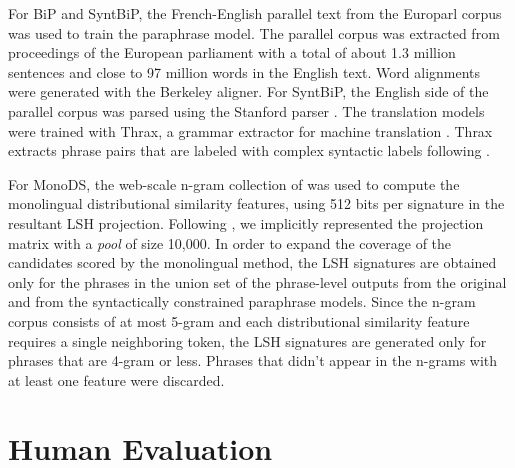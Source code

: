 \documentclass[11pt]{article}
\begin{document}
For BiP and SyntBiP, the French-English parallel text from the Europarl corpus \cite{Koehn05} was used to train the paraphrase model. The parallel corpus was extracted from proceedings of the European parliament with a total of about 1.3 million sentences and close to 97 million words in the English text. Word alignments were generated with the Berkeley aligner. For SyntBiP, the English side of the parallel corpus was parsed using the Stanford parser \cite{KleinManning03}. 
The translation models were trained with Thrax, a grammar extractor for machine translation \cite{WeeseThrax11}. %
Thrax extracts phrase pairs that are labeled with complex syntactic labels following .

For MonoDS, the web-scale n-gram collection of  was used
to compute the monolingual distributional similarity features, using 512 bits
per signature in the resultant LSH projection. Following
, we implicitly represented the projection matrix
with a \emph{pool} of size 10,000. In order to expand the coverage of the
candidates scored by the monolingual method, the LSH signatures are obtained
only for the phrases in the union set of the phrase-level outputs from the
original and from the syntactically constrained paraphrase models. Since the
n-gram corpus consists of at most 5-gram and each distributional similarity
feature requires a single neighboring token, the LSH signatures are generated
only for phrases that are 4-gram or less. Phrases that didn't appear in the
n-grams with at least one feature were discarded.



\vspace{-.1cm}
\section{Human Evaluation}
\vspace{-.1cm}
\end{document}
